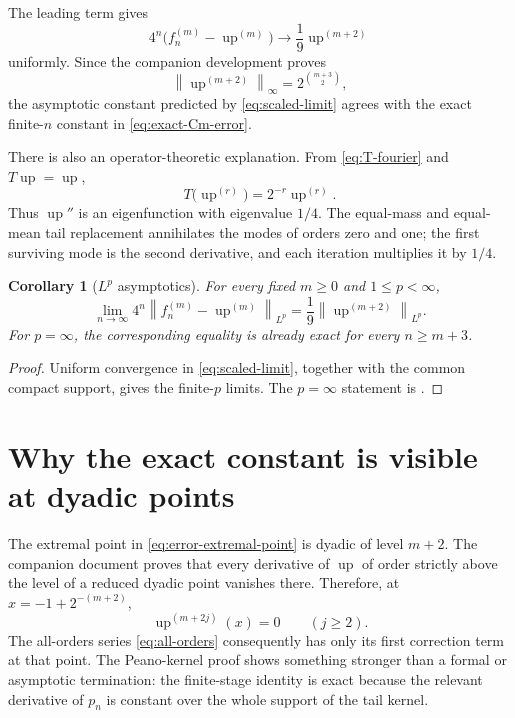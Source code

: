 \documentclass[11pt,oneside]{article}
\newtheorem{corollary}[theorem]{Corollary}
\theoremstyle{definition}
\theoremstyle{remark}
\newcommand{\Up}{\operatorname{up}}
\newcommand{\norm}[1]{\left\lVert #1\right\rVert}
\begin{document}
The leading term gives
\begin{equation}
 4^n\bigl(f_n^{(m)}-\Up^{(m)}\bigr)
 \longrightarrow\frac19\Up^{(m+2)}                       \label{eq:scaled-limit}
\end{equation}
uniformly.  Since the companion development proves
\begin{equation}
 \norm{\Up^{(m+2)}}_\infty=2^{\binom{m+3}{2}},             \label{eq:up-sharp-bound}
\end{equation}
the asymptotic constant predicted by \eqref{eq:scaled-limit} agrees with the exact finite-$n$
constant in \eqref{eq:exact-Cm-error}.

There is also an operator-theoretic explanation.  From \eqref{eq:T-fourier} and $T\Up=\Up$,
\begin{equation}
 T\bigl(\Up^{(r)}\bigr)=2^{-r}\Up^{(r)}.                   \label{eq:T-eigenfunctions}
\end{equation}
Thus $\Up''$ is an eigenfunction with eigenvalue $1/4$.  The equal-mass and equal-mean tail
replacement annihilates the modes of orders zero and one; the first surviving mode is the
second derivative, and each iteration multiplies it by $1/4$.

\begin{corollary}[$L^p$ asymptotics]
\label{cor:Lp}
For every fixed $m\ge0$ and $1\le p<\infty$,
\begin{equation}
 \lim_{n\to\infty}4^n\norm{f_n^{(m)}-\Up^{(m)}}_{L^p}
 =\frac19\norm{\Up^{(m+2)}}_{L^p}.                         \label{eq:Lp-asymptotic}
\end{equation}
For $p=\infty$, the corresponding equality is already exact for every $n\ge m+3$.
\end{corollary}

\begin{proof}
Uniform convergence in \eqref{eq:scaled-limit}, together with the common compact support,
gives the finite-$p$ limits.  The $p=\infty$ statement is .
\end{proof}

\section{Why the exact constant is visible at dyadic points}
\label{sec:dyadic-extrema}

The extremal point in \eqref{eq:error-extremal-point} is dyadic of level $m+2$.  The companion
document proves that every derivative of $\Up$ of order strictly above the level of a reduced
dyadic point vanishes there.  Therefore, at
$x=-1+2^{-(m+2)}$,
\begin{equation}
 \Up^{(m+2j)}(x)=0\qquad(j\ge2).                           \label{eq:high-derivatives-vanish}
\end{equation}
The all-orders series \eqref{eq:all-orders} consequently has only its first correction term at
that point.  The Peano-kernel proof shows something stronger than a formal or asymptotic
termination: the finite-stage identity is exact because the relevant derivative of $p_n$ is
constant over the whole support of the tail kernel.
\end{document}
